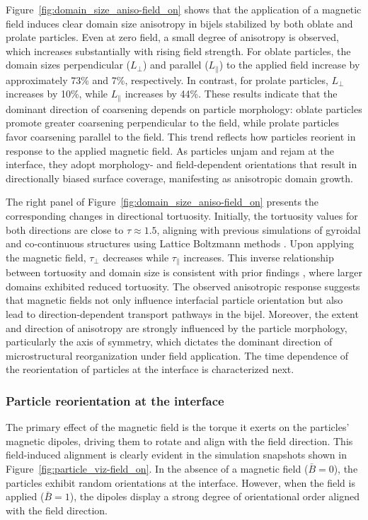 Figure~\ref{fig:domain_size_aniso-field_on} shows that the application of a magnetic field induces clear domain size anisotropy in bijels stabilized by both oblate 
and prolate particles. Even at zero field, a small degree of anisotropy is observed, which increases substantially with rising field strength. For oblate particles, 
the domain sizes perpendicular (\(L_\perp\)) and parallel (\(L_\parallel\)) to the applied field increase by approximately 73\% and 7\%, respectively. In contrast, 
for prolate particles, \(L_\perp\) increases by 10\%, while \(L_\parallel\) increases by 44\%. These results indicate that the dominant direction of coarsening 
depends on particle morphology: oblate particles promote greater coarsening perpendicular to the field, while prolate particles favor coarsening parallel to the 
field. This trend reflects how particles reorient in response to the applied magnetic field. As particles unjam and rejam 
at the interface, they adopt morphology- and field-dependent orientations that result in directionally biased surface coverage, manifesting as anisotropic domain 
growth.

The right panel of Figure~\ref{fig:domain_size_aniso-field_on} presents the corresponding changes in directional tortuosity. Initially, the tortuosity values 
for both directions are close to \(\tau \approx 1.5\), aligning with previous simulations of gyroidal and co-continuous structures using Lattice Boltzmann methods 
\cite{luo_macroscopic_2020}. Upon applying the magnetic field, \(\tau_\perp\) decreases while \(\tau_\parallel\) increases. This inverse relationship between 
tortuosity and domain size is consistent with prior findings \cite{karthikeyan_formation_2024}, where larger domains exhibited 
reduced tortuosity. The observed anisotropic response suggests that magnetic fields not only influence interfacial particle orientation but also lead to 
direction-dependent transport pathways in the bijel. Moreover, the extent and direction of anisotropy are strongly influenced by the particle morphology, 
particularly the axis of symmetry, which dictates the dominant direction of microstructural reorganization under field application. The time dependence of
the reorientation of particles at the interface is characterized next.

\subsubsection{Particle reorientation at the interface}

The primary effect of the magnetic field is the torque it exerts on the particles' magnetic dipoles, driving them to rotate and align with the field direction. 
This field-induced alignment is clearly evident in the simulation snapshots shown in Figure~\ref{fig:particle_viz-field_on}. In the absence of a magnetic field 
(\(\bar{B} = 0\)), the particles exhibit random orientations at the interface. However, when the field is applied (\(\bar{B} = 1\)), the dipoles display a strong 
degree of orientational order aligned with the field direction.

